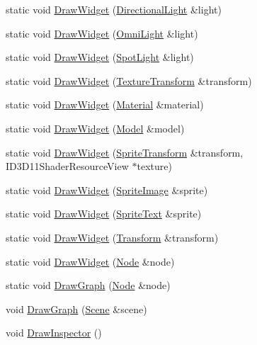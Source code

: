 \begin{DoxyCompactItemize}
\item 
static void \hyperlink{namespacemage_1_1editor_aef32dcc2d0eea998af9d9a0f59d1bb29}{Draw\+Widget} (\hyperlink{classmage_1_1_directional_light}{Directional\+Light} \&light)
\item 
static void \hyperlink{namespacemage_1_1editor_a8012cb9cb72a5daafccb06bcf70ad75f}{Draw\+Widget} (\hyperlink{classmage_1_1_omni_light}{Omni\+Light} \&light)
\item 
static void \hyperlink{namespacemage_1_1editor_ad905a3a02d4abac8d53987f027bdf172}{Draw\+Widget} (\hyperlink{classmage_1_1_spot_light}{Spot\+Light} \&light)
\item 
static void \hyperlink{namespacemage_1_1editor_a756fb73ee6d0c207c1bf9c317ca5c3be}{Draw\+Widget} (\hyperlink{classmage_1_1_texture_transform}{Texture\+Transform} \&transform)
\item 
static void \hyperlink{namespacemage_1_1editor_ac832c9e938c5f40096064ec44dbbe955}{Draw\+Widget} (\hyperlink{classmage_1_1_material}{Material} \&material)
\item 
static void \hyperlink{namespacemage_1_1editor_a3cc4349fe745bfbb06d4a662fc6c1437}{Draw\+Widget} (\hyperlink{classmage_1_1_model}{Model} \&model)
\item 
static void \hyperlink{namespacemage_1_1editor_af9c4d46afaf6441cb6da8eef2bf5ac67}{Draw\+Widget} (\hyperlink{classmage_1_1_sprite_transform}{Sprite\+Transform} \&transform, I\+D3\+D11\+Shader\+Resource\+View $\ast$texture)
\item 
static void \hyperlink{namespacemage_1_1editor_ac52d7465a1b9bc40a1b446decc7bd4b3}{Draw\+Widget} (\hyperlink{classmage_1_1_sprite_image}{Sprite\+Image} \&sprite)
\item 
static void \hyperlink{namespacemage_1_1editor_a64511af584a39f949d3c5a548adde050}{Draw\+Widget} (\hyperlink{classmage_1_1_sprite_text}{Sprite\+Text} \&sprite)
\item 
static void \hyperlink{namespacemage_1_1editor_a522fbfe5aa8ada8eb3ebf0c40e02ef1d}{Draw\+Widget} (\hyperlink{classmage_1_1_transform}{Transform} \&transform)
\item 
static void \hyperlink{namespacemage_1_1editor_a5687225a5c6ea498168c394df0d50410}{Draw\+Widget} (\hyperlink{classmage_1_1_node}{Node} \&node)
\item 
static void \hyperlink{namespacemage_1_1editor_a73bdc66f67454e7178d83f1bf32d273c}{Draw\+Graph} (\hyperlink{classmage_1_1_node}{Node} \&node)
\item 
void \hyperlink{namespacemage_1_1editor_aeff2b7b5e4be51f68c9c4a6b7a1f411a}{Draw\+Graph} (\hyperlink{classmage_1_1_scene}{Scene} \&scene)
\item 
void \hyperlink{namespacemage_1_1editor_a2bd3932d0c7f95a953f3dd5d3f6870dd}{Draw\+Inspector} ()
\end{DoxyCompactItemize}
